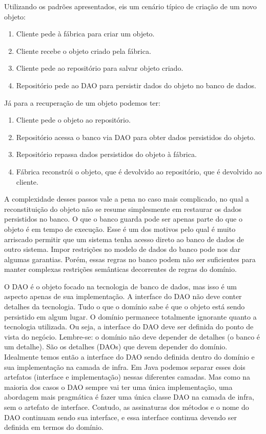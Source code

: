 \documentclass[a4paper, 12pt]{article}
\begin{document}
Utilizando os padrões apresentados, eis um cenário típico de criação de um novo objeto:

\begin{enumerate}
\item Cliente pede à fábrica para criar um objeto.
\item Cliente recebe o objeto criado pela fábrica.
\item Cliente pede ao repositório para salvar objeto criado.
\item Repositório pede ao DAO para persistir dados do objeto no banco de dados.
\end{enumerate}

Já para a recuperação de um objeto podemos ter:

\begin{enumerate}
\item Cliente pede o objeto ao repositório.
\item Repositório acessa o banco via DAO para obter dados persistidos do objeto.
\item Repositório repassa dados persistidos do objeto à fábrica.
\item Fábrica reconstrói o objeto, que é devolvido ao repositório, que é devolvido ao cliente.
\end{enumerate}

A complexidade desses passos vale a pena no caso mais complicado, no qual a reconstituição do objeto não se resume simplesmente em restaurar os dados persistidos no banco. O que o banco guarda pode ser apenas parte do que o objeto é em tempo de execução. Esse é um dos motivos pelo qual é muito arriscado permitir que um sistema tenha acesso direto ao banco de dados de outro sistema. Impor restrições no modelo de dados do banco pode nos dar algumas garantias. Porém, essas regras no banco podem não ser suficientes para manter complexas restrições semânticas decorrentes de regras do domínio.

O DAO é o objeto focado na tecnologia de banco de dados, mas isso é um aspecto apenas de sua implementação. A interface do DAO não deve conter detalhes da tecnologia. Tudo o que o domínio sabe é que o objeto está sendo persistido em algum lugar. O domínio permanece totalmente ignorante quanto a tecnologia utilizada. Ou seja, a interface do DAO deve ser definida do ponto de vista do negócio. Lembre-se: o domínio não deve depender de detalhes (o banco é um detalhe). São os detalhes (DAOs) que devem depender do domínio. Idealmente temos então a interface do DAO sendo definida dentro do domínio e sua implementação na camada de infra. Em Java podemos separar esses dois artefatos (interface e implementação) nessas diferentes camadas. Mas como na maioria dos casos o DAO sempre vai ter uma única implementação, uma abordagem mais pragmática é fazer uma única classe DAO na camada de infra, sem o artefato de interface. Contudo, as assinaturas dos métodos e o nome do DAO continuam sendo sua interface, e essa interface continua devendo ser definida em termos do domínio.
\end{document}
